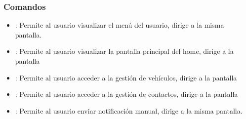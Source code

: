 \subsubsection{Comandos}
    \begin{itemize}
    	
    		\item \btnMenu [Menú]: Permite al usuario visualizar el menú del usuario, dirige a la misma pantalla.
    		\item \btnHome [Home]: Permite al usuario visualizar la pantalla principal del home, dirige a la pantalla 
    		\item {}: Permite al usuario acceder a la gestión de vehículos, dirige a la pantalla 
    		\item {}: Permite al usuario acceder a la gestión de contactos, dirige a la pantalla 
    		\item {}: Permite al usuario enviar notificación manual, dirige a la misma pantalla.
    	
    \end{itemize}

%
